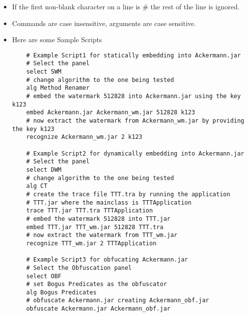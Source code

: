 \begin{itemize}
 \item  If the first non-blank character on a line is \# the rest of
        the line is ignored.
 \item  Commands are case insensitive, arguments are case sensitive.
 \item	Here are some Sample Scripts
 \begin{verbatim}
	# Example Script1 for statically embedding into Ackermann.jar                                    
	# Select the panel  
	select SWM
	# change algorithm to the one being tested
	alg Method Renamer
	# embed the watermark 512828 into Ackermann.jar using the key k123
	embed Ackermann.jar Ackermann_wm.jar 512828 k123
	# now extract the watermark from Ackermann_wm.jar by providing the key k123
	recognize Ackermann_wm.jar 2 k123
	
	# Example Script2 for dynamically embedding into Ackermann.jar                                    
	# Select the panel  
	select DWM
	# change algorithm to the one being tested
	alg CT
	# create the trace file TTT.tra by running the application
	# TTT.jar where the mainclass is TTTApplication 
	trace TTT.jar TTT.tra TTTApplication
	# embed the watermark 512828 into TTT.jar 
	embed TTT.jar TTT_wm.jar 512828 TTT.tra
	# now extract the watermark from TTT_wm.jar 
	recognize TTT_wm.jar 2 TTTApplication
 	
 	# Example Script3 for obfucating Ackermann.jar                                    
 	# Select the Obfuscation panel  
 	select OBF
 	# set Bogus Predicates as the obfuscator
	alg Bogus Predicates
	# obfuscate Ackermann.jar creating Ackermann_obf.jar
	obfuscate Ackermann.jar Ackermann_obf.jar
   \end{verbatim}
 
 
\end{itemize}
